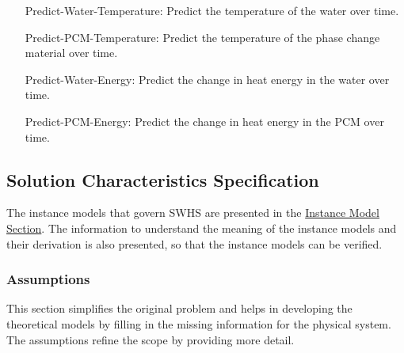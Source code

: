 \documentclass[12pt]{article}
\begin{document}
\begin{itemize}
\item[Predict-Water-Temperature:\phantomsection\label{waterTempGS}]{Predict the temperature of the water over time.}
\item[Predict-PCM-Temperature:\phantomsection\label{pcmTempGS}]{Predict the temperature of the phase change material over time.}
\item[Predict-Water-Energy:\phantomsection\label{waterEnergyGS}]{Predict the change in heat energy in the water over time.}
\item[Predict-PCM-Energy:\phantomsection\label{pcmEnergyGS}]{Predict the change in heat energy in the PCM over time.}
\end{itemize}
\subsection{Solution Characteristics Specification}
\label{Sec:SolCharSpec}
The instance models that govern SWHS are presented in the \hyperref[Sec:IMs]{Instance Model Section}. The information to understand the meaning of the instance models and their derivation is also presented, so that the instance models can be verified.

\subsubsection{Assumptions}
\label{Sec:Assumps}
This section simplifies the original problem and helps in developing the theoretical models by filling in the missing information for the physical system. The assumptions refine the scope by providing more detail.
\end{document}
